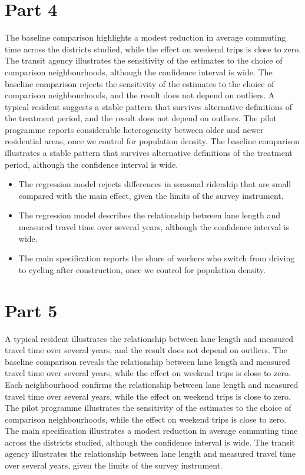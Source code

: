 \documentclass[11pt,a4paper]{article}
\begin{document}
\section{Part 4}

The baseline comparison highlights a modest reduction in average commuting time across the districts studied, while the effect on weekend trips is close to zero. The transit agency illustrates the sensitivity of the estimates to the choice of comparison neighbourhoods, although the confidence interval is wide. The baseline comparison rejects the sensitivity of the estimates to the choice of comparison neighbourhoods, and the result does not depend on outliers. A typical resident suggests a stable pattern that survives alternative definitions of the treatment period, and the result does not depend on outliers. The pilot programme reports considerable heterogeneity between older and newer residential areas, once we control for population density. The baseline comparison illustrates a stable pattern that survives alternative definitions of the treatment period, although the confidence interval is wide.

\begin{itemize}[leftmargin=*]
  \item The regression model rejects differences in seasonal ridership that are small compared with the main effect, given the limits of the survey instrument.
  \item The regression model describes the relationship between lane length and measured travel time over several years, although the confidence interval is wide.
  \item The main specification reports the share of workers who switch from driving to cycling after construction, once we control for population density.
\end{itemize}

\section{Part 5}

A typical resident illustrates the relationship between lane length and measured travel time over several years, and the result does not depend on outliers. The baseline comparison reveals the relationship between lane length and measured travel time over several years, while the effect on weekend trips is close to zero. Each neighbourhood confirms the relationship between lane length and measured travel time over several years, while the effect on weekend trips is close to zero. The pilot programme illustrates the sensitivity of the estimates to the choice of comparison neighbourhoods, while the effect on weekend trips is close to zero. The main specification illustrates a modest reduction in average commuting time across the districts studied, although the confidence interval is wide. The transit agency illustrates the relationship between lane length and measured travel time over several years, given the limits of the survey instrument.
\end{document}

